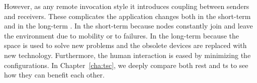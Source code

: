 However, as any remote invocation style it introduces coupling between senders and receivers.
These complicates the application changes both in the short-term and in the long-term \citep{johanson_extending_2004}.
In the short-term because nodes constantly join and leave the environment due to mobility or to failures.
In the long-term because the space is used to solve new problems and the obsolete devices are replaced with new technology.
Furthermore, the human interaction is eased by minimizing the configurations.
In Chapter~\ref{cha:tsc}, we deeply compare both \ac{rest} and \ac{ts} to see how they can benefit each other.